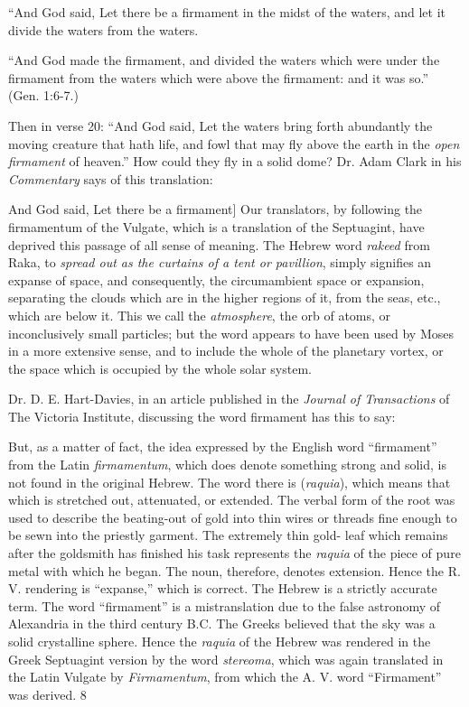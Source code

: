 ``And God said, Let there be a firmament in the midst of the waters, and let it divide the
waters from the waters.

``And God made the firmament, and divided the waters which were under the firmament from
the waters which were above the firmament: and it was so.'' (Gen. 1:6-7.)

Then in verse 20: ``And God said, Let the waters bring forth abundantly the moving creature
that hath life, and fowl that may fly above the earth in the \textit{open firmament} of heaven.'' How
could they fly in a solid dome? Dr. Adam Clark in his \textit{Commentary} says of this translation:

And God said, Let there be a firmament] Our translators, by following the firmamentum of
the Vulgate, which is a translation of the Septuagint, have deprived this passage of all sense
of meaning. The Hebrew word \textit{rakeed} from Raka, to \textit{spread out as the curtains of a tent or
pavillion}, simply signifies an expanse of space, and consequently, the circumambient space
or expansion, separating the clouds which are in the higher regions of it, from the seas, etc.,
which are below it. This we call the \textit{atmosphere}, the orb of atoms, or inconclusively small
particles; but the word appears to have been used by Moses in a more extensive sense, and to
include the whole of the planetary vortex, or the space which is occupied by the whole solar
system.

Dr. D. E. Hart-Davies, in an article published in the \textit{Journal of Transactions} of The Victoria
Institute, discussing the word firmament has this to say:

But, as a matter of fact, the idea expressed by the English word ``firmament'' from the Latin
\textit{firmamentum}, which does denote something strong and solid, is not found in the original
Hebrew. The word there is (\textit{raquia}), which means that which is stretched out, attenuated, or
extended. The verbal form of the root was used to describe the beating-out of gold into thin
wires or threads fine enough to be sewn into the priestly garment. The extremely thin gold-
leaf which remains after the goldsmith has finished his task represents the \textit{raquia} of the piece
of pure metal with which he began. The noun, therefore, denotes extension. Hence the R. V.
rendering is ``expanse,'' which is correct. The Hebrew is a strictly accurate term. The word
``firmament'' is a mistranslation due to the false astronomy of Alexandria in the third century
B.C. The Greeks believed that the sky was a solid crystalline sphere. Hence the \textit{raquia} of the
Hebrew was rendered in the Greek Septuagint version by the word \textit{stereoma}, which was
again translated in the Latin Vulgate by \textit{Firmamentum}, from which the A. V. word
``Firmament'' was derived. 8

